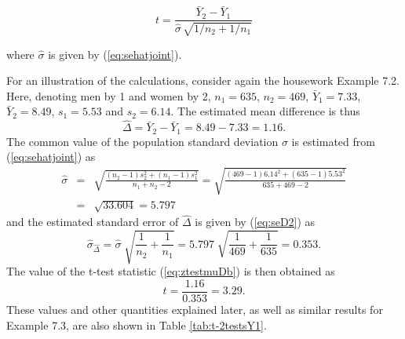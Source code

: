 \documentclass[11pt,a4paper,openany]{book}
\begin{document}
\begin{equation}t=
\frac{\bar{Y}_{2}-\bar{Y}_{1}}
{\hat{\sigma}\, \sqrt{1/n_{2}+1/n_{1}}}
\label{eq:ztestmuDb}\end{equation}

where \(\hat{\sigma}\) is given by (\ref{eq:sehatjoint}).

For an illustration of the calculations, consider again the housework
Example 7.2. Here, denoting men by 1 and women by 2, \(n_{1}=635\),
\(n_{2}=469\), \(\bar{Y}_{1}=7.33\), \(\bar{Y}_{2}=8.49\),
\(s_{1}=5.53\) and \(s_{2}=6.14\). The estimated mean difference is thus
\[\hat{\Delta}=\bar{Y}_{2}-\bar{Y}_{1}=8.49-7.33=1.16.\] The common
value of the population standard deviation \(\sigma\) is estimated from
(\ref{eq:sehatjoint}) as \[\begin{aligned}
\hat{\sigma}&=&
\sqrt{\frac{(n_{2}-1)s^{2}_{2}+(n_{1}-1)s^{2}_{1}}{n_{1}+n_{2}-2}}
=
\sqrt{\frac{(469-1) 6.14^{2}+(635-1) 5.53^{2}}{635+469-2}}\\
&=& \sqrt{33.604}=5.797\end{aligned}\] and the estimated standard error
of \(\hat{\Delta}\) is given by (\ref{eq:seD2}) as
\[\hat{\sigma}_{\hat{\Delta}} =
\hat{\sigma} \; \sqrt{\frac{1}{n_{2}}+\frac{1}{n_{1}}}
=5.797 \; \sqrt{\frac{1}{469}+\frac{1}{635}}=0.353.\] The value of the
t-test statistic (\ref{eq:ztestmuDb}) is then obtained as
\[t=\frac{1.16}{0.353}=3.29.\] These values and other quantities
explained later, as well as similar results for Example 7.3, are also
shown in Table \ref{tab:t-2testsY1}.
\end{document}
